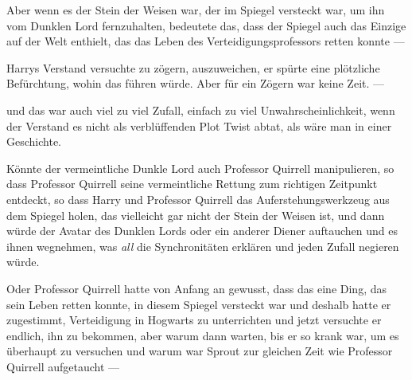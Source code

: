 Aber wenn es der Stein der Weisen war, der im Spiegel versteckt war, um ihn vom Dunklen Lord fernzuhalten, bedeutete das, dass der Spiegel auch das Einzige auf der Welt enthielt, das das Leben des Verteidigungsprofessors retten konnte —

Harrys Verstand versuchte zu zögern, auszuweichen, er spürte eine plötzliche Befürchtung, wohin das führen würde. Aber für ein Zögern war keine Zeit. —

und das war auch viel zu viel Zufall, einfach zu viel Unwahrscheinlichkeit, wenn der Verstand es nicht als verblüffenden Plot Twist abtat, als wäre man in einer Geschichte.

Könnte der vermeintliche Dunkle Lord auch Professor Quirrell manipulieren, so dass Professor Quirrell seine vermeintliche Rettung zum richtigen Zeitpunkt entdeckt, so dass Harry und Professor Quirrell das Auferstehungswerkzeug aus dem Spiegel holen, das vielleicht gar nicht der Stein der Weisen ist, und dann würde der Avatar des Dunklen Lords oder ein anderer Diener auftauchen und es ihnen wegnehmen, was \emph{all} die Synchronitäten erklären und jeden Zufall negieren würde.

Oder Professor Quirrell hatte von Anfang an gewusst, dass das eine Ding, das sein Leben retten konnte, in diesem Spiegel versteckt war und deshalb hatte er zugestimmt, Verteidigung in Hogwarts zu unterrichten und jetzt versuchte er endlich, ihn zu bekommen, aber warum dann warten, bis er so krank war, um es überhaupt zu versuchen und warum war Sprout zur gleichen Zeit wie Professor Quirrell aufgetaucht —

